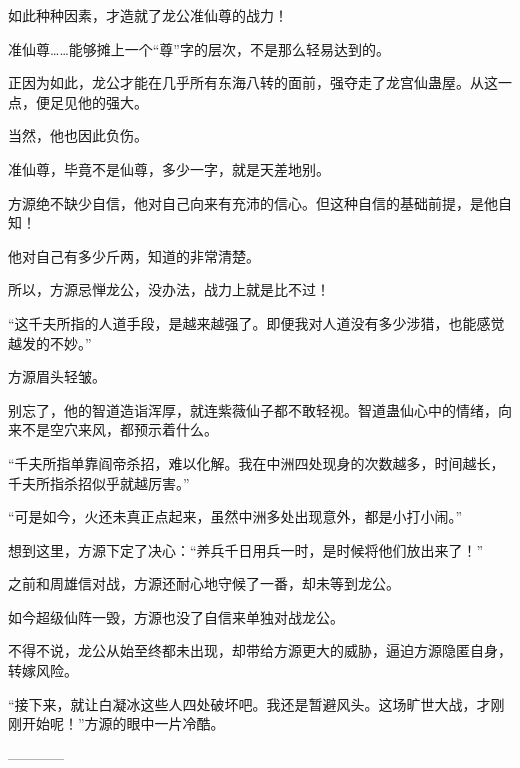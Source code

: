 \begin{this_body}
如此种种因素，才造就了龙公准仙尊的战力！

准仙尊……能够摊上一个“尊”字的层次，不是那么轻易达到的。

正因为如此，龙公才能在几乎所有东海八转的面前，强夺走了龙宫仙蛊屋。从这一点，便足见他的强大。

当然，他也因此负伤。

准仙尊，毕竟不是仙尊，多少一字，就是天差地别。

方源绝不缺少自信，他对自己向来有充沛的信心。但这种自信的基础前提，是他自知！

他对自己有多少斤两，知道的非常清楚。

所以，方源忌惮龙公，没办法，战力上就是比不过！

“这千夫所指的人道手段，是越来越强了。即便我对人道没有多少涉猎，也能感觉越发的不妙。”

方源眉头轻皱。

别忘了，他的智道造诣浑厚，就连紫薇仙子都不敢轻视。智道蛊仙心中的情绪，向来不是空穴来风，都预示着什么。

“千夫所指单靠阎帝杀招，难以化解。我在中洲四处现身的次数越多，时间越长，千夫所指杀招似乎就越厉害。”

“可是如今，火还未真正点起来，虽然中洲多处出现意外，都是小打小闹。”

想到这里，方源下定了决心：“养兵千日用兵一时，是时候将他们放出来了！”

之前和周雄信对战，方源还耐心地守候了一番，却未等到龙公。

如今超级仙阵一毁，方源也没了自信来单独对战龙公。

不得不说，龙公从始至终都未出现，却带给方源更大的威胁，逼迫方源隐匿自身，转嫁风险。

“接下来，就让白凝冰这些人四处破坏吧。我还是暂避风头。这场旷世大战，才刚刚开始呢！”方源的眼中一片冷酷。

------------

\end{this_body}

